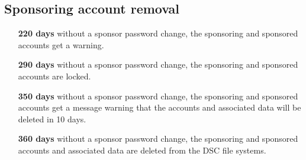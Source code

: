 \documentclass[12pt,a4paper]{article}
\begin{document}
\subsection{Sponsoring account removal}
\begin{itemize}
    \item[\textbf{220 days}] without a sponsor password change, the sponsoring and sponsored accounts get a warning.
    \item[\textbf{290 days}] without a sponsor password change, the sponsoring and sponsored accounts are locked.
    \item[\textbf{350 days}] without a sponsor password change, the sponsoring and sponsored accounts get a message warning that the accounts and associated data will be deleted in 10 days.
    \item[\textbf{360 days}] without a sponsor password change, the sponsoring and sponsored accounts and associated data are deleted from the DSC file systems.
\end{itemize}
\end{document}
